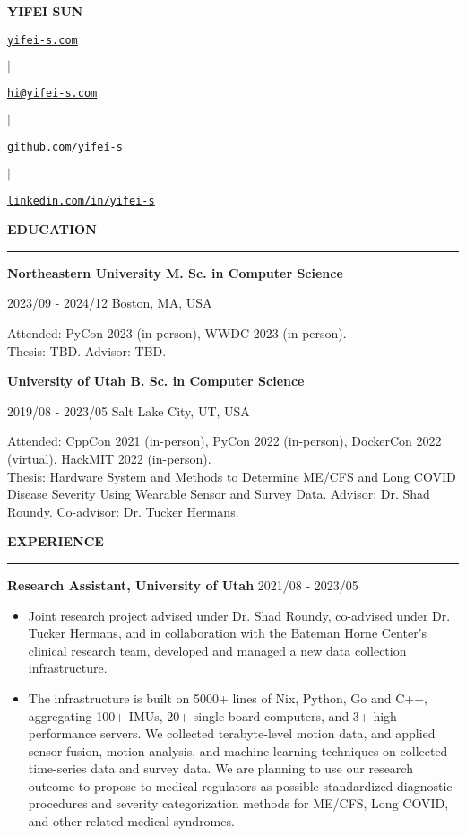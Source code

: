\documentclass{letter}
\newcommand{\link}[2]{
\href{#1}{\underline{\texttt{#2}}}
}
\newcommand{\section}[1]{
\Large{\textbf{\MakeUppercase{#1}}}

\vspace{-0.3in}
\rule{\textwidth}{0.25mm}
\vspace{-0.35in}
}
\newcommand{\education}[5]{
\large{\textbf{#1 \hfill #2}}

\vspace{-1.5mm}

\normalsize{#3 \hfill #4}

\vspace{-1.5mm}

\normalsize{#5}
}
\newcommand{\experience}[3]{
\large{\textbf{#1} \hfill \normalsize{#2}}

\vspace{-2.5mm}

\normalsize{#3}

\vspace{-2.5mm}
}
\begin{document}
\begin{center}
\huge{\textbf{\MakeUppercase{Yifei Sun}}} 

\normalsize{
\link{https://yifei.md}{yifei-s.com}
\hspace{1mm}$\mid$\hspace{1mm}
\link{mailto:yifei@email.com}{hi@yifei-s.com}
\hspace{1mm}$\mid$\hspace{1mm}
\link{https://github.com/stepbrobd}{github.com/yifei-s}
\hspace{1mm}$\mid$\hspace{1mm}
\link{https://www.linkedin.com/in/yifei-s}{linkedin.com/in/yifei-s}
}
\end{center}

\section{Education}

\education{Northeastern University}
{M. Sc. in Computer Science}
{2023/09 - 2024/12}
{Boston, MA, USA} {
Attended: PyCon 2023 (in-person), WWDC 2023 (in-person).\\
Thesis: TBD. Advisor: TBD.
}

\education{University of Utah}
{B. Sc. in Computer Science}
{2019/08 - 2023/05}
{Salt Lake City, UT, USA} {
Attended: CppCon 2021 (in-person), PyCon 2022 (in-person), DockerCon 2022 (virtual), HackMIT 2022 (in-person).\\
Thesis: Hardware System and Methods to Determine ME/CFS and Long COVID Disease Severity Using Wearable Sensor and Survey Data. Advisor: Dr. Shad Roundy. Co-advisor: Dr. Tucker Hermans.
}

\section{Experience}

\experience{Research Assistant, University of Utah}{2021/08 - 2023/05} {
\begin{itemize}
\item Joint research project advised under Dr. Shad Roundy, co-advised under Dr. Tucker Hermans, and in collaboration with the Bateman Horne Center's clinical research team, developed and managed a new data collection infrastructure.
\item The infrastructure is built on 5000+ lines of Nix, Python, Go and C++, aggregating 100+ IMUs, 20+ single-board computers, and 3+ high-performance servers. We collected terabyte-level motion data, and applied sensor fusion, motion analysis, and machine learning techniques on collected time-series data and survey data. We are planning to use our research outcome to propose to medical regulators as possible standardized diagnostic procedures and severity categorization methods for ME/CFS, Long COVID, and other related medical syndromes.
\end{itemize}
}
\end{document}
